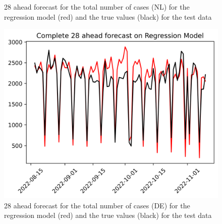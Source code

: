 \begin{figure}
\begin{minipage}{.32\textwidth}
  \caption{28 ahead forecast for the total number of cases (NL) for the regression model (red) and the true values (black) for the test data}
  \label{fig:tot_cases_fc_28_RM}
\end{minipage}
\begin{minipage}{.32\textwidth}
  \centering
  \includegraphics[width=\linewidth]{pics/28_ah/DE_Complete_28_ahead_Regression Model.png}
  \caption{28 ahead forecast for the total number of cases (DE) for the regression model (red) and the true values (black) for the test data}
  \label{fig:tot_cases_fc_28_RM_DE}
\end{minipage}

\end{figure}
